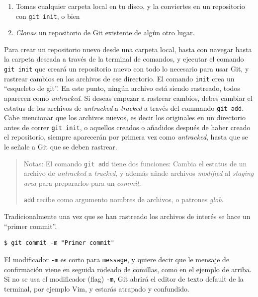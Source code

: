 \documentclass[spanish, 12pt, a4paper]{article}
\begin{document}
\begin{enumerate}
\def\labelenumi{\arabic{enumi}.}
\item
  Tomas cualquier carpeta local en tu disco, y la conviertes en un
  repositorio con \passthrough{\lstinline!git init!}, o bien
\item
  \emph{Clonas} un repositorio de Git existente de algún otro lugar.
\end{enumerate}

Para crear un repositorio nuevo desde una carpeta local, basta con
navegar hasta la carpeta deseada a través de la terminal de comandos, y
ejecutar el comando \passthrough{\lstinline!git init!} que creará un
repositorio nuevo con todo lo necesario para usar Git, y rastrear
cambios en los archivos de ese directorio. El comando
\passthrough{\lstinline!init!} crea un ``esqueleto de git''. En este
punto, ningún archivo está siendo rastreado, todos aparecen como
\emph{untracked}. Si deseas empezar a rastrear cambios, debes cambiar el
estatus de los archivos de \emph{untracked} a \emph{tracked} a través
del commando \passthrough{\lstinline!git add!}. Cabe mencionar que los
archivos nuevos, es decir los originales en un directorio antes de
correr \passthrough{\lstinline!git init!}, o aquellos creados o añadidos
después de haber creado el repositorio, siempre aparecerán por primera
vez como \emph{untracked}, hasta que se le señale a Git que se deben
rastrear.

\begin{quote}
Notas: El comando \passthrough{\lstinline!git add!} tiene dos funciones:
Cambia el estatus de un archivo de \emph{untracked} a \emph{tracked}, y
además añade archivos \emph{modified} al \emph{staging area} para
prepararlos para un \emph{commit}.

\passthrough{\lstinline!add!} recibe como argumento nombres de archivos,
o patrones \emph{glob}.
\end{quote}

Tradicionalmente una vez que se han rastreado los archivos de interés se
hace un ``primer commit''.

\begin{lstlisting}
$ git commit -m "Primer commit"
\end{lstlisting}

El modificador \passthrough{\lstinline!-m!} es corto para
\passthrough{\lstinline!message!}, y quiere decir que le mensaje de
confirmación viene en seguida rodeado de comillas, como en el ejemplo de
arriba. Si no se usa el modificador (flag) \passthrough{\lstinline!-m!},
Git abrirá el editor de texto default de la terminal, por ejemplo Vim, y
estarás atrapado y confundido.
\end{document}

